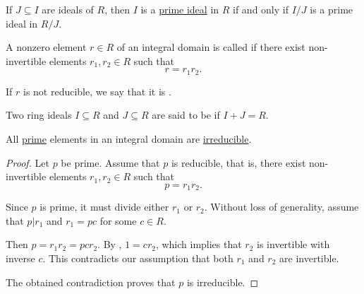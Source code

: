 \begin{proposition}\label{thm:prime_ideal_iff_prime_quotient_ideal}
  If \( J \subseteq I \) are ideals of \( R \), then \( I \) is a \hyperref[def:prime_ring_ideal]{prime ideal} in \( R \) if and only if \( I / J \) is a prime ideal in  \( R / J \).
\end{proposition}

\begin{definition}\label{def:irreducible_ring_element}
  A nonzero element \( r \in R \) of an integral domain is called  if there exist non-invertible elements \( r_1, r_2 \in R \) such that
  \begin{equation*}
    r = r_1 r_2.
  \end{equation*}

  If \( r \) is not reducible, we say that it is .
\end{definition}

\begin{definition}\label{def:coprime_ring_ideals}
  Two ring ideals \( I \subseteq R \) and \( J \subseteq R \) are said to be  if \( I + J = R \).
\end{definition}

\begin{proposition}\label{thm:prime_implies_irreducible}
  All \hyperref[def:prime_ring_ideal]{prime} elements in an integral domain are \hyperref[def:irreducible_ring_element]{irreducible}.
\end{proposition}
\begin{proof}
  Let \( p \) be prime. Assume that \( p \) is reducible, that is, there exist non-invertible elements \( r_1, r_2 \in R \) such that
  \begin{equation*}
    p = r_1 r_2.
  \end{equation*}

  Since \( p \) is prime, it must divide either \( r_1 \) or \( r_2 \). Without loss of generality, assume that \( p | r_1 \) and \( r_1 = pc \) for some \( c \in R \).

  Then \( p = r_1 r_2 = pc r_2 \). By , \( 1 = c r_2 \), which implies that \( r_2 \) is invertible with inverse \( c \). This contradicts our assumption that both \( r_1 \) and \( r_2 \) are invertible.

  The obtained contradiction proves that \( p \) is irreducible.
\end{proof}

